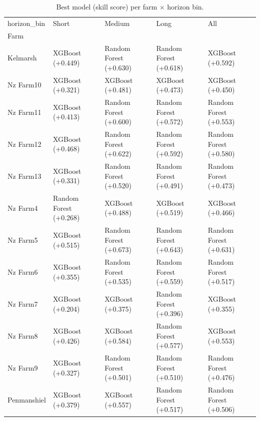 \begin{table}[ht]
\caption{Best model (skill score) per farm $\times$ horizon bin.}
\label{tab:per_farm_best}
\begin{tabular}{lllll}
\toprule
horizon_bin & Short & Medium & Long & All \\
Farm &  &  &  &  \\
\midrule
Kelmarsh & XGBoost (+0.449) & Random Forest (+0.630) & Random Forest (+0.618) & XGBoost (+0.592) \\
Nz Farm10 & XGBoost (+0.321) & XGBoost (+0.481) & XGBoost (+0.473) & XGBoost (+0.450) \\
Nz Farm11 & XGBoost (+0.413) & Random Forest (+0.600) & Random Forest (+0.572) & Random Forest (+0.553) \\
Nz Farm12 & XGBoost (+0.468) & Random Forest (+0.622) & Random Forest (+0.592) & Random Forest (+0.580) \\
Nz Farm13 & XGBoost (+0.331) & Random Forest (+0.520) & Random Forest (+0.491) & Random Forest (+0.473) \\
Nz Farm4 & Random Forest (+0.268) & XGBoost (+0.488) & XGBoost (+0.519) & XGBoost (+0.466) \\
Nz Farm5 & XGBoost (+0.515) & Random Forest (+0.673) & Random Forest (+0.643) & Random Forest (+0.631) \\
Nz Farm6 & XGBoost (+0.355) & Random Forest (+0.535) & Random Forest (+0.559) & Random Forest (+0.517) \\
Nz Farm7 & XGBoost (+0.204) & XGBoost (+0.375) & Random Forest (+0.396) & XGBoost (+0.355) \\
Nz Farm8 & XGBoost (+0.426) & XGBoost (+0.584) & Random Forest (+0.577) & XGBoost (+0.553) \\
Nz Farm9 & XGBoost (+0.327) & Random Forest (+0.501) & Random Forest (+0.510) & Random Forest (+0.476) \\
Penmanshiel & XGBoost (+0.379) & XGBoost (+0.557) & Random Forest (+0.517) & Random Forest (+0.506) \\
\bottomrule
\end{tabular}
\end{table}
